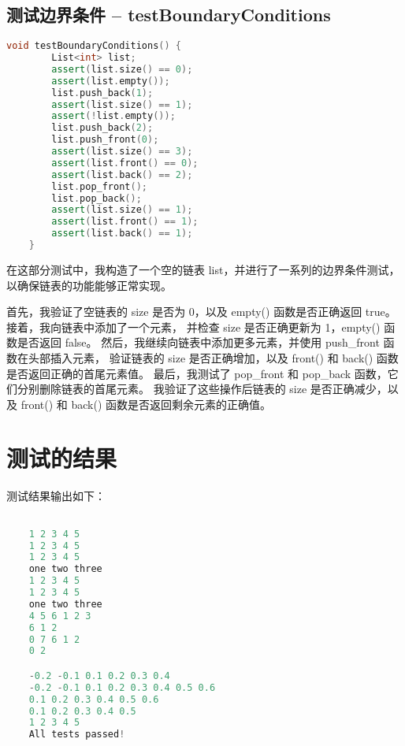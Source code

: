 \documentclass[UTF8]{ctexart}
\begin{document}
\subsection{测试边界条件 -- testBoundaryConditions}
\begin{lstlisting}[language=c++, breaklines=true, keywordstyle=\color{blue!70}, commentstyle=\color{red!50!green!50!blue!50}, frame=shadowbox, rulesepcolor=\color{red!20!green!20!blue!20}]
    void testBoundaryConditions() {
        List<int> list;
        assert(list.size() == 0);
        assert(list.empty());
        list.push_back(1);
        assert(list.size() == 1);
        assert(!list.empty());
        list.push_back(2);
        list.push_front(0);
        assert(list.size() == 3);
        assert(list.front() == 0);
        assert(list.back() == 2);
        list.pop_front();
        list.pop_back();
        assert(list.size() == 1);
        assert(list.front() == 1);
        assert(list.back() == 1);
    }
\end{lstlisting}

在这部分测试中，我构造了一个空的链表 list，并进行了一系列的边界条件测试，以确保链表的功能能够正常实现。

首先，我验证了空链表的 size 是否为 0，以及 empty() 函数是否正确返回 true。接着，我向链表中添加了一个元素，
并检查 size 是否正确更新为 1，empty() 函数是否返回 false。
然后，我继续向链表中添加更多元素，并使用 push\_front 函数在头部插入元素，
验证链表的 size 是否正确增加，以及 front() 和 back() 函数是否返回正确的首尾元素值。
最后，我测试了 pop\_front 和 pop\_back 函数，它们分别删除链表的首尾元素。
我验证了这些操作后链表的 size 是否正确减少，以及 front() 和 back() 函数是否返回剩余元素的正确值。


\section{测试的结果}

测试结果输出如下：
\begin{lstlisting}[language=c++, breaklines=true, frame=shadowbox, rulesepcolor=\color{red!20!green!20!blue!20}]

    1 2 3 4 5 
    1 2 3 4 5
    1 2 3 4 5
    one two three
    1 2 3 4 5
    1 2 3 4 5
    one two three
    4 5 6 1 2 3
    6 1 2
    0 7 6 1 2
    0 2

    -0.2 -0.1 0.1 0.2 0.3 0.4
    -0.2 -0.1 0.1 0.2 0.3 0.4 0.5 0.6
    0.1 0.2 0.3 0.4 0.5 0.6
    0.1 0.2 0.3 0.4 0.5
    1 2 3 4 5
    All tests passed!
\end{lstlisting}
\end{document}
